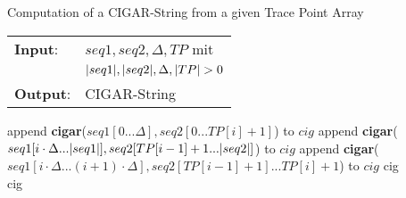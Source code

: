 \begin{algorithm}
\caption{Computation of a CIGAR-String from a given Trace Point Array}
\label{decode}
\noindent\begin{tabular}{@{}l@{~}l}
	\textbf{Input}:
	&$seq1, seq2, \Delta, TP$ mit\\
	&$|seq1|, |seq2|, \Delta, |TP| > 0$\\
	\textbf{Output}:&CIGAR-String
\end{tabular}
\medskip
	\begin{algorithmic}[1]
		\State {}
				\State append \textbf{cigar}($seq1[0...\Delta], seq2[0...TP[i] + 1]$) to $cig$
				\State append \textbf{cigar}($seq1[i \cdot \Delta...|seq1|], seq2[TP[i - 1] + 1...|seq2|]$) to $cig$
			\Else
				\State append \textbf{cigar}($seq1[i \cdot \Delta...(i + 1) \cdot \Delta], seq2[TP[i - 1] + 1]...TP[i] + 1$) to $cig$
			\EndIf
		\EndFor
		\State {}
		\State \Return cig
		\EndFunction\\
		
		\State {}
		\State {}
			\State {}
				\State {}
				\EndIf
			\EndIf
				\State {}
			\EndIf
		\EndFor
		\State \Return cig
		\EndFunction
	\end{algorithmic}
\end{algorithm}